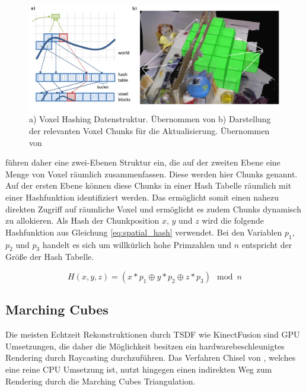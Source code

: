 \begin{figure}[h]
  \centering
	\includegraphics[width=1.0\textwidth]{content/images/methods/hashing.png} 
  \caption{a) Voxel Hashing Datenstruktur. Übernommen von \citet{niessner2013real} b) Darstellung der relevanten Voxel Chunks für die Aktualisierung. Übernommen von \citet{Klingensmith_2015_7924}}
  \label{fig:hashing}
\end{figure}

\citet{niessner2013real} führen daher eine zwei-Ebenen Struktur ein, die auf der zweiten Ebene eine Menge von Voxel räumlich zusammenfassen. Diese werden hier Chunks genannt. Auf der ersten Ebene können diese Chunks in einer Hash Tabelle räumlich mit einer Hashfunktion identifiziert werden. Das ermöglicht somit einen nahezu direkten Zugriff auf räumliche Voxel und ermöglicht es zudem Chunks dynamisch zu allokieren. Als Hash der Chunkposition \(x\), \(y\) und \(z\) wird die folgende Hashfunktion aus Gleichung \ref{eq:spatial_hash} verwendet. Bei den Variablen \(p_1\), \(p_2\) und \(p_3\) handelt es sich um willkürlich hohe Primzahlen und \(n\) entspricht der Größe der Hash Tabelle. 

\begin{equation}\label{eq:spatial_hash}
H(x,y,z) = (x * p_1 \oplus y * p_2 \oplus z * p_3) \mod n
\end{equation}

\subsection{Marching Cubes}

Die meisten Echtzeit Rekonstruktionen durch TSDF wie KinectFusion sind GPU Umsetzungen, die daher die Möglichkeit besitzen ein hardwarebeschleunigtes Rendering durch Raycasting durchzuführen. Das Verfahren Chisel von \citet{Klingensmith_2015_7924}, welches eine reine CPU Umsetzung ist, nutzt hingegen einen indirekten Weg zum Rendering durch die Marching Cubes Triangulation. \\

